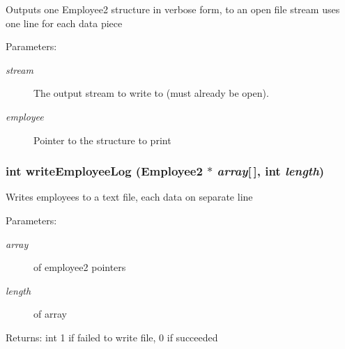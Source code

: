 Outputs one Employee2 structure in verbose form, to an open file stream uses one line for each data piece \begin{Desc}
\item[Parameters:]
\begin{description}
\item[{\em stream}]The output stream to write to (must already be open). \item[{\em employee}]Pointer to the structure to print \end{description}
\end{Desc}
\subsubsection{\setlength{\rightskip}{0pt plus 5cm}int write\-Employee\-Log (\bf{Employee2} $\ast$ {\em array}[$\,$], int {\em length})}\label{part3_8c_9ba4906a5f403b8dc58afcc1af8303cd}


Writes employees to a text file, each data on separate line \begin{Desc}
\item[Parameters:]
\begin{description}
\item[{\em array}]of employee2 pointers \item[{\em length}]of array \end{description}
\end{Desc}
\begin{Desc}
\item[Returns:]int 1 if failed to write file, 0 if succeeded \end{Desc}
